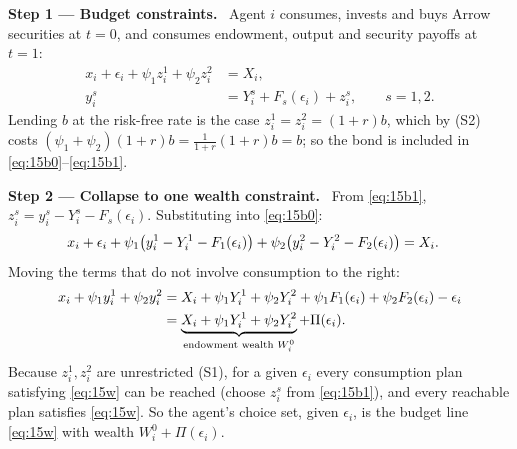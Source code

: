 \documentclass[11pt,a4paper]{article}
\numberwithin{equation}{section}
\newcommand{\step}[2]{\par\medskip\noindent\textbf{Step #1 --- #2.}~}
\begin{document}
\step{1}{Budget constraints} Agent $i$ consumes, invests and buys Arrow securities at $t=0$, and
consumes endowment, output and security payoffs at $t=1$:
\begin{align}
  x_i + \epsilon_i + \psi_1 z_i^1 + \psi_2 z_i^2 &= X_i, \label{eq:15b0}\\
  y_i^s &= Y_i^s + F_s(\epsilon_i) + z_i^s, \qquad s=1,2. \label{eq:15b1}
\end{align}
Lending $b$ at the risk-free rate is the case $z_i^1=z_i^2=(1+r)b$, which by (S2) costs
$(\psi_1+\psi_2)(1+r)b=\frac{1}{1+r}(1+r)b=b$; so the bond is included in \eqref{eq:15b0}--\eqref{eq:15b1}.

\step{2}{Collapse to one wealth constraint} From \eqref{eq:15b1}, $z_i^s = y_i^s - Y_i^s - F_s(\epsilon_i)$.
Substituting into \eqref{eq:15b0}:
\begin{align}
  x_i + \epsilon_i + \psi_1\big(y_i^1 - Y_i^1 - F_1(\epsilon_i)\big) + \psi_2\big(y_i^2 - Y_i^2 - F_2(\epsilon_i)\big) &= X_i. \notag
\end{align}
Moving the terms that do not involve consumption to the right:
\begin{align}
  x_i + \psi_1 y_i^1 + \psi_2 y_i^2 &= X_i + \psi_1Y_i^1 + \psi_2Y_i^2 + \psi_1F_1(\epsilon_i) + \psi_2F_2(\epsilon_i) - \epsilon_i \notag\\
  &= \underbrace{X_i + \psi_1Y_i^1 + \psi_2Y_i^2}_{\text{endowment wealth } W_i^0} + \Pi(\epsilon_i). \label{eq:15w}
\end{align}
Because $z_i^1,z_i^2$ are unrestricted (S1), for a given $\epsilon_i$ every consumption plan
satisfying \eqref{eq:15w} can be reached (choose $z_i^s$ from \eqref{eq:15b1}), and every
reachable plan satisfies \eqref{eq:15w}. So the agent's choice set, given $\epsilon_i$, is the
budget line \eqref{eq:15w} with wealth $W_i^0+\Pi(\epsilon_i)$.
\end{document}
